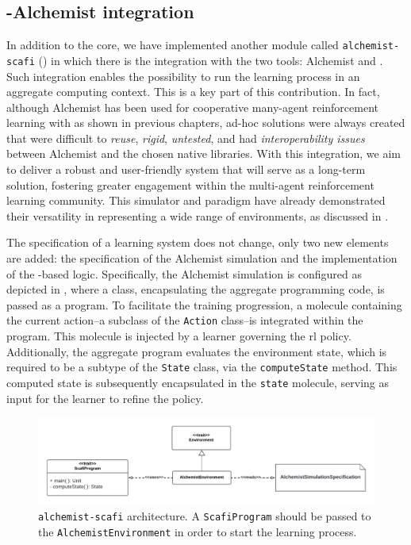 \subsection{\scafi{}-Alchemist integration} In addition to the core, 
 we have implemented another module called \texttt{alchemist-scafi} () 
 in which there is the integration with the two tools: 
 Alchemist and \scafi{}.
%
Such integration enables the possibility to run the learning process 
 in an aggregate computing context.
This is a key part of this contribution. 
 In fact, although Alchemist has been used for cooperative many-agent reinforcement learning with \scafi{} as shown in previous chapters, 
 ad-hoc solutions were always created that were difficult to \emph{reuse}, 
 \emph{rigid}, \emph{untested}, and had \emph{interoperability issues} between Alchemist 
 and the chosen native libraries.
With this integration, 
 we aim to deliver a robust and user-friendly system that will serve as a long-term solution, 
 fostering greater engagement within the multi-agent reinforcement learning community. 
 This simulator and paradigm have already demonstrated their versatility in representing a wide range of environments, as discussed in .

The specification of a learning system does not change, only two new elements are added: 
 the specification of the Alchemist simulation and the implementation of the \scafi{}-based logic.
%
Specifically, 
 the Alchemist simulation is configured as depicted in , 
 where a \scafi{} class, encapsulating the aggregate programming code, is passed as a program. 
 To facilitate the training progression, a molecule containing the current action--a subclass of the \texttt{Action} class--is integrated within the \scafi{} program. 
 This molecule is injected by a learner governing the \ac{rl} policy. Additionally, the aggregate program evaluates the environment state, which is required to be a subtype of the \texttt{State} class, 
 via the \texttt{computeState} method. 
 This computed state is subsequently encapsulated in the \texttt{state} molecule, serving as input for the learner to refine the policy.
\begin{figure}[t]
    \centering
    \includegraphics[width=\textwidth]{papers/coordination2023/imgs/alchemist-scafi-arc.pdf}
    \caption[\scarlib{} \texttt{alchemist-scafi} architecture]{\scarlib{} \texttt{alchemist-scafi} architecture. 
    A \texttt{ScafiProgram} should be passed to the \texttt{AlchemistEnvironment}
    in order to start the learning process. 
    }
    \label{coordination2023:fig:alchemist-arc}
\end{figure}

